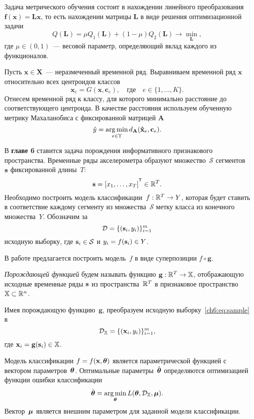 \documentclass[11pt, a5paper]{dissert}
\begin{document}
Задача метрического обучения состоит в нахождении линейного преобразования $\mathbf{f}(\mathbf{x}) = \mathbf{Lx}$, то есть нахождении матрицы $\mathbf{L}$ в виде решения оптимизационной задачи
\begin{equation}
	\label{ch5:eq:Qmin}
	Q(\mathbf{L}) = \mu Q_1(\mathbf{L}) + (1 - \mu) Q_2(\mathbf{L}) \rightarrow \min_{\mathbf{L}},
\end{equation}
где $\mu \in (0, 1)$~--- весовой параметр, определяющий вклад каждого из функционалов.

Пусть $\mathbf{x} \in \mathbf{X}$~--- неразмеченный временной ряд. Выравниваем временной ряд $\mathbf{x}$ относительно всех центроидов классов
\[
	\mathbf{\hat{x}}_e = G(\mathbf{x}, \mathbf{c}_e), \quad \text{где} \quad e \in \{1, \dots, K\}.
\]
Отнесем временной ряд к классу, для которого минимально расстояние до соответствующего центроида. В качестве расстояния используем обученную метрику Махаланобиса с фиксированной матрицей $\mathbf{A}$
\[
	\hat{y} = \mathop{\arg \min}\limits_{e \in \mathbb{Y}} d_\mathbf{A}(\mathbf{\hat{x}}_e, \mathbf{c}_e).
\]

В \textbf{главе 6} ставится задача порождения информативного признакового пространства.
Временные ряды акселерометра образуют множество~$\mathcal{S}$ сегментов~$\mathbf{s}$ фиксированной длины~$T$:
\[
	\bs = [x_1, \dots, x_T]^{\T} \in \bbR^T.
\]
Необходимо построить модель классификации~$f: \mathbb{R}^T \rightarrow Y$, которая будет ставить в соответствие каждому сегменту из множества~$\mathcal{S}$ метку класса из конечного множества~$Y$.
Обозначим за
\begin{equation}
	\mathcal{D} = \{(\mathbf{s}_i, y_i)\}_{i=1}^m
	\label{ch6:eq:sample}
\end{equation}
исходную выборку, где $\mathbf{s}_i \in \mathcal{S}$ и $y_i = f(\mathbf{s}_i)\in Y$.

В работе предлагается построить модель~$f$ в виде суперпозиции $f \circ \mathbf{g}$.
\begin{definition}
	\textit{Порождающей функцией} будем называть функцию $\mathbf{g}: \mathbb{R}^T \rightarrow \mathbb{X}$, отображающую исходные временные ряды $\mathbf{s}$ из пространства~$\mathbb{R}^{T} $ в признаковое пространство~$\mathbb{X} \subset \mathbb{R}^n$.
\end{definition}
Имея порождающую функцию~$\mathbf{g}$, преобразуем исходную выборку~\eqref{ch6:eq:sample} в
\[
	\mathcal{D}_{\mathbb{X}} = \{(\mathbf{x}_i, y_i)\}_{i=1}^m,
\]
где $\mathbf{x}_i = \mathbf{g}(\mathbf{s}_i) \in \mathbb{X}$. 

Модель классификации $f=f(\mathbf{x}, \boldsymbol{\theta})$ является параметрической функцией с вектором параметров~$\boldsymbol{\theta}$. 
Оптимальные параметры~$\hat{\boldsymbol{\theta}}$ определяются оптимизацией функции ошибки классификации
\begin{equation}
	\hat{\boldsymbol{\theta}} = \mathop{\arg \min}\limits_{\boldsymbol{\theta}} L(\boldsymbol{\theta}, \mathcal{D}_{\mathbb{X}}, \boldsymbol{\mu}).
	\label{ch6:eq:optimal_classification_params}
\end{equation}
Вектор~$\boldsymbol{\mu}$ является внешним параметром для заданной модели классификации. 
\end{document}
